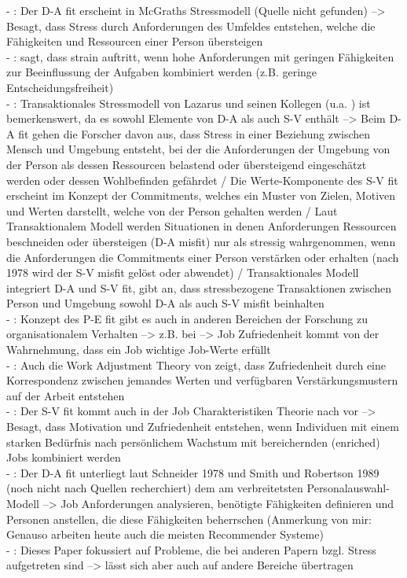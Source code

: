 - \cite[S. 2f.]{edwards:1990}: Der D-A fit erscheint in McGraths Stressmodell (Quelle nicht gefunden) --> Besagt, dass Stress durch Anforderungen des Umfeldes entstehen, welche die Fähigkeiten und Ressourcen einer Person übersteigen \\
- \cite[S. 3]{edwards:1990}: \textcite{karasek:1979} sagt, dass strain auftritt, wenn hohe Anforderungen mit geringen Fähigkeiten zur Beeinflussung der Aufgaben kombiniert werden (z.B. geringe Entscheidungsfreiheit) \\
- \cite[S. 3]{edwards:1990}: Transaktionales Stressmodell von Lazarus und seinen Kollegen (u.a. \textcite{lazarus:1978}) ist bemerkenswert, da es sowohl Elemente von D-A als auch S-V enthält --> Beim D-A fit gehen die Forscher davon aus, dass Stress in einer Beziehung zwischen Mensch und Umgebung entsteht, bei der die Anforderungen der Umgebung von der Person als dessen Ressourcen belastend oder übersteigend eingeschätzt werden oder dessen Wohlbefinden gefährdet / Die Werte-Komponente des S-V fit erscheint im Konzept der Commitments, welches ein Muster von Zielen, Motiven und Werten darstellt, welche von der Person gehalten werden / Laut Transaktionalem Modell werden Situationen in denen Anforderungen Ressourcen beschneiden oder übersteigen (D-A misfit) nur als stressig wahrgenommen, wenn die Anforderungen die Commitments einer Person verstärken oder erhalten (nach \textcite{harrison:1978} 1978 wird der S-V misfit gelöst oder abwendet) / Transaktionales Modell integriert D-A und S-V fit, gibt an, dass stressbezogene Transaktionen zwischen Person und Umgebung sowohl D-A als auch S-V misfit beinhalten \\
- \cite[S. 3]{edwards:1990}: Konzept des P-E fit gibt es auch in anderen Bereichen der Forschung zu organisationalem Verhalten --> z.B. bei \textcite{locke:1969} --> Job Zufriedenheit kommt von der Wahrnehmung, dass ein Job wichtige Job-Werte erfüllt \\
- \cite[S. 3]{edwards:1990}: Auch die Work Adjustment Theory von \textcite{workAdjustment:1964} zeigt, dass Zufriedenheit durch eine Korrespondenz zwischen jemandes Werten und verfügbaren Verstärkungsmustern auf der Arbeit entstehen \\
- \cite[S. 3]{edwards:1990}: Der S-V fit kommt auch in der Job Charakteristiken Theorie nach \textcite{hackmanOldham:1987} vor --> Besagt, dass Motivation und Zufriedenheit entstehen, wenn Individuen mit einem starken Bedürfnis nach persönlichem Wachstum mit bereichernden (enriched) Jobs kombiniert werden \\
- \cite[S. 3]{edwards:1990}: Der D-A fit unterliegt laut Schneider 1978 und Smith und Robertson 1989 (noch nicht nach Quellen recherchiert) dem am verbreitetsten Personalauswahl-Modell --> Job Anforderungen analysieren, benötigte Fähigkeiten definieren und Personen anstellen, die diese Fähigkeiten beherrschen (Anmerkung von mir: Genauso arbeiten heute auch die meisten Recommender Systeme) \\
- \cite[S. 3]{edwards:1990}: Dieses Paper fokussiert auf Probleme, die bei anderen Papern bzgl. Stress aufgetreten sind --> lässt sich aber auch auf andere Bereiche übertragen \\

